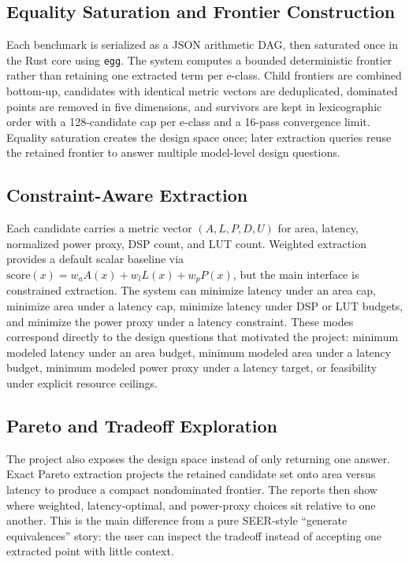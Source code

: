 \documentclass[sigplan,10pt,review]{acmart}
\begin{document}
\subsection{Equality Saturation and Frontier Construction}
Each benchmark is serialized as a JSON arithmetic DAG, then saturated once in the Rust core using \texttt{egg}. The system computes a bounded deterministic frontier rather than retaining one extracted term per e-class. Child frontiers are combined bottom-up, candidates with identical metric vectors are deduplicated, dominated points are removed in five dimensions, and survivors are kept in lexicographic order with a 128-candidate cap per e-class and a 16-pass convergence limit. Equality saturation creates the design space once; later extraction queries reuse the retained frontier to answer multiple model-level design questions.

\subsection{Constraint-Aware Extraction}
Each candidate carries a metric vector $(A,L,P,D,U)$ for area, latency, normalized power proxy, DSP count, and LUT count. Weighted extraction provides a default scalar baseline via $\mathrm{score}(x)=w_aA(x)+w_lL(x)+w_pP(x)$, but the main interface is constrained extraction. The system can minimize latency under an area cap, minimize area under a latency cap, minimize latency under DSP or LUT budgets, and minimize the power proxy under a latency constraint. These modes correspond directly to the design questions that motivated the project: minimum modeled latency under an area budget, minimum modeled area under a latency budget, minimum modeled power proxy under a latency target, or feasibility under explicit resource ceilings.

\subsection{Pareto and Tradeoff Exploration}
The project also exposes the design space instead of only returning one answer. Exact Pareto extraction projects the retained candidate set onto area versus latency to produce a compact nondominated frontier. The reports then show where weighted, latency-optimal, and power-proxy choices sit relative to one another. This is the main difference from a pure SEER-style ``generate equivalences'' story: the user can inspect the tradeoff instead of accepting one extracted point with little context.
\end{document}
